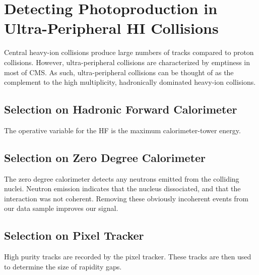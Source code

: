 
\chapter{Detecting Photoproduction in Ultra-Peripheral HI Collisions}

Central heavy-ion collisions produce large numbers of tracks compared to proton collisions. However, ultra-peripheral collisions are characterized by emptiness in most of CMS. As such, ultra-peripheral collisions can be thought of as the complement to the high multiplicity, hadronically dominated heavy-ion collisions. 

\section{Selection on Hadronic Forward Calorimeter}

	The operative variable for the HF is the maximum calorimeter-tower energy.

\section{Selection on Zero Degree Calorimeter}

	The zero degree calorimeter detects any neutrons emitted from the colliding nuclei. Neutron emission indicates that the nucleus dissociated, and that the interaction was not coherent. Removing these obviously incoherent events from our data sample improves our signal. 

\section{Selection on Pixel Tracker}

	High purity tracks are recorded by the pixel tracker. These tracks are then used to determine the size of rapidity gaps.